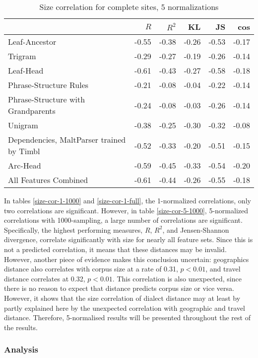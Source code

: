 \begin{table}
\begin{tabular}{l|rrrrr}
& $R$ & $R^2$ & KL & JS & cos  \\ \hline
  Leaf-Ancestor&-0.55 & -0.38 & -0.26 & -0.53 & -0.17\\
  Trigram&-0.29 & -0.27 & -0.19 & -0.26 & -0.14\\
  Leaf-Head&-0.61 & -0.43 & -0.27 & -0.58 & -0.18\\
  Phrase-Structure Rules&-0.21 & -0.08 & -0.04 & -0.22 & -0.14\\
  Phrase-Structure with Grandparents&-0.24 & -0.08 & -0.03 & -0.26 & -0.14\\
  Unigram&-0.38 & -0.25 & -0.30 & -0.32 & -0.08\\
  Dependencies, MaltParser trained by Timbl&-0.52 & -0.33 & -0.20 & -0.51 & -0.15\\
  Arc-Head&-0.59 & -0.45 & -0.33 & -0.54 & -0.20\\
  All Features Combined&-0.61 & -0.44 & -0.26 & -0.55 & -0.18\\
\end{tabular}
\caption{Size correlation for complete sites, 5 normalizations}
\label{size-cor-5-full}
\end{table}

In tables \ref{size-cor-1-1000} and \ref{size-cor-1-full}, the
1-normalized correlations, only two correlations are
significant. However, in table \ref{size-cor-5-1000}, 5-normalized
correlations with 1000-sampling, a large number of correlations are
significant. Specifically, the highest performing measures, $R$, $R^2$,
and Jensen-Shannon divergence, correlate significantly with size for
nearly all feature sets. Since this is not a predicted correlation, it
means that these distances may be invalid. However, another piece of
evidence makes this conclusion uncertain: geographics distance also
correlates with corpus size at a rate of 0.31, $p < 0.01$, and travel
distance correlates at 0.32, $p < 0.01$. This correlation is also
unexpected, since there is no reason to expect that distance predicts
corpus size or vice versa. However, it shows that the size correlation of
dialect distance may at least by partly explained here by the
unexpected correlation with geographic and travel distance. Therefore,
5-normalised results will be presented throughout the rest of the
results.

\subsubsection{Analysis}

